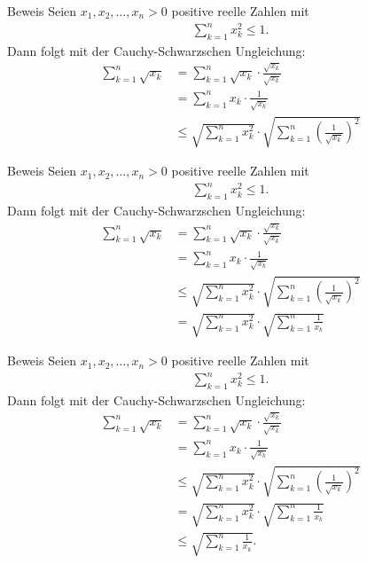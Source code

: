 \documentclass[10pt]{beamer}
\begin{document}
\begin{frame}{Beweis}
    Seien \( x_{1}, x_{2}, \ldots, x_{n} > 0 \) positive reelle Zahlen mit 
    \begin{align*}
        \sum_{k = 1}^{n} x_{k}^{2} 
        \leq 1.
    \end{align*}
    Dann folgt mit der Cauchy-Schwarzschen Ungleichung:
    \begin{align*}
        \sum_{k = 1}^{n} \sqrt{x_{k}}
        & = \sum_{k = 1}^{n} \sqrt{x_{k}} \cdot \frac{\sqrt{x_{k}}}{\sqrt{x_{k}}} \\
        & = \sum_{k = 1}^{n} x_{k} \cdot \frac{1}{\sqrt{x_{k}}} \\
        & \leq \sqrt{\sum_{k = 1}^{n} x_{k}^{2}} \cdot \sqrt{\sum_{k = 1}^{n} \left( \frac{1}{\sqrt{x_{k}}} \right)^{2}}
    \end{align*}
\end{frame}



\begin{frame}{Beweis}
    Seien \( x_{1}, x_{2}, \ldots, x_{n} > 0 \) positive reelle Zahlen mit 
    \begin{align*}
        \sum_{k = 1}^{n} x_{k}^{2} 
        \leq 1.
    \end{align*}
    Dann folgt mit der Cauchy-Schwarzschen Ungleichung:
    \begin{align*}
        \sum_{k = 1}^{n} \sqrt{x_{k}}
        & = \sum_{k = 1}^{n} \sqrt{x_{k}} \cdot \frac{\sqrt{x_{k}}}{\sqrt{x_{k}}} \\
        & = \sum_{k = 1}^{n} x_{k} \cdot \frac{1}{\sqrt{x_{k}}} \\
        & \leq \sqrt{\sum_{k = 1}^{n} x_{k}^{2}} \cdot \sqrt{\sum_{k = 1}^{n} \left( \frac{1}{\sqrt{x_{k}}} \right)^{2}} \\
        & = \sqrt{\sum_{k = 1}^{n} x_{k}^{2}} \cdot \sqrt{\sum_{k = 1}^{n} \frac{1}{x_{k}}}
    \end{align*}
\end{frame}



\begin{frame}{Beweis}
    Seien \( x_{1}, x_{2}, \ldots, x_{n} > 0 \) positive reelle Zahlen mit 
    \begin{align*}
        \sum_{k = 1}^{n} x_{k}^{2} 
        \leq 1.
    \end{align*}
    Dann folgt mit der Cauchy-Schwarzschen Ungleichung:
    \begin{align*}
        \sum_{k = 1}^{n} \sqrt{x_{k}}
        & = \sum_{k = 1}^{n} \sqrt{x_{k}} \cdot \frac{\sqrt{x_{k}}}{\sqrt{x_{k}}} \\
        & = \sum_{k = 1}^{n} x_{k} \cdot \frac{1}{\sqrt{x_{k}}} \\
        & \leq \sqrt{\sum_{k = 1}^{n} x_{k}^{2}} \cdot \sqrt{\sum_{k = 1}^{n} \left( \frac{1}{\sqrt{x_{k}}} \right)^{2}} \\
        & = \sqrt{\sum_{k = 1}^{n} x_{k}^{2}} \cdot \sqrt{\sum_{k = 1}^{n} \frac{1}{x_{k}}} \\
        & \leq \sqrt{\sum_{k = 1}^{n} \frac{1}{x_{k}}}.
    \end{align*}
\end{frame}
\end{document}
